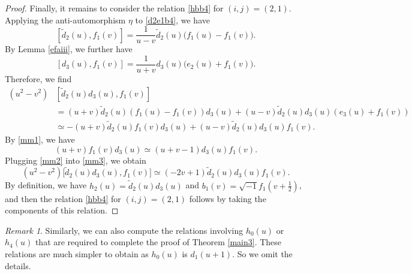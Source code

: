 \documentclass[11pt,reqno]{amsart}
\numberwithin{equation}{section}
\newtheorem{prop}[thm]{Proposition}
\theoremstyle{definition}
\theoremstyle{remark}
\newtheorem{rem}[thm]{Remark}
\newcommand{\beq}{\begin{equation}}
\newcommand{\eeq}{\end{equation}}
\newcommand{\tl}{\tilde}
\newcommand{\scrX}{{\mathscr{X}}}
\begin{document}
\begin{proof}
Finally, it remains to consider the relation \eqref{hbb4} for $(i,j)=(2,1)$. Applying the anti-automorphism $\eta$ to \eqref{d2e1b4}, we have
\[
[\tl d_2(u),f_1(v)]=\frac{1}{u-v}\tl d_2(u)\big(f_1(u)-f_1(v)\big).
\]
By Lemma \ref{efaiii}, we further have
\beq\label{mm1}
[d_3(u),f_1(v)]=\frac{1}{u+v}d_3(u)\big(e_2(u)+f_1(v)\big).
\eeq
Therefore, we find
\beq\label{mm3}
\begin{split}
(u^2-v^2)&[\tl d_2(u)d_3(u),f_1(v)]\\
&=(u+v)\tl d_2(u)(f_1(u)-f_1(v))d_3(u)+(u-v)\tl d_2(u)d_3(u)(e_3(u)+f_1(v))\\
&\simeq -(u+v)\tl d_2(u)f_1(v)d_3(u)+(u-v)\tl d_2(u)d_3(u)f_1(v).
\end{split}
\eeq
By \eqref{mm1}, we have 
\beq\label{mm2}
(u+v)f_1(v)d_3(u)\simeq (u+v-1)d_3(u)f_1(v).
\eeq
Plugging \eqref{mm2} into \eqref{mm3}, we obtain
\[
(u^2-v^2)\big[\tl d_2(u)d_3(u),f_1(v)\big]\simeq (-2v+1)\tl d_2(u)d_3(u)f_1(v).
\]
By definition, we have $h_2(u)=\tl d_2(u)d_3(u)$ and $b_1(v)=\sqrt{-1}f_1(v+\frac{1}{2})$, and then the relation \eqref{hbb4} for $(i,j)=(2,1)$ follows by taking the components of this relation.
\end{proof}


\begin{rem}
Similarly, we can also compute the relations involving $h_0(u)$ or $h_4(u)$ that are required to complete the proof of Theorem \ref{main3}. These relations are much simpler to obtain as $h_0(u)$ is $d_1(u+1)$. So we omit the details.
\end{rem}




\end{document}
